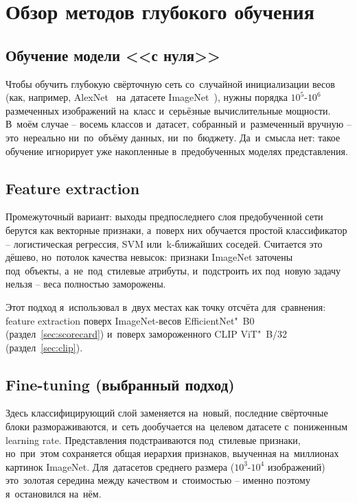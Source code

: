 \documentclass[a4paper,12pt]{diplom}
\begin{document}
\section{Обзор методов глубокого обучения}
\label{sec:methods}

\subsection{Обучение модели <<с нуля>>}

Чтобы обучить глубокую свёрточную сеть со~случайной инициализации весов (как, например, AlexNet~\cite{Krizhevsky:2012} на~датасете ImageNet~\cite{Deng:2009}), нужны порядка $10^5$-$10^6$ размеченных изображений на~класс и~серьёзные вычислительные мощности. В~моём случае -- восемь классов и~датасет, собранный и~размеченный вручную -- это~нереально ни~по~объёму данных, ни~по~бюджету. Да~и~смысла нет: такое обучение игнорирует уже накопленные в~предобученных моделях представления.

\subsection{Feature extraction}

Промежуточный вариант: выходы предпоследнего слоя предобученной сети берутся как векторные признаки, а~поверх них обучается простой классификатор -- логистическая регрессия, SVM или~k-ближайших соседей. Считается это дёшево, но~потолок качества невысок: признаки ImageNet заточены под~объекты, а~не~под~стилевые атрибуты, и~подстроить их под~новую задачу нельзя -- веса полностью заморожены.

Этот подход я~использовал в~двух местах как точку отсчёта для~сравнения: feature extraction поверх ImageNet-весов EfficientNet"~B0 (раздел~\ref{sec:scorecard}) и~поверх замороженного CLIP ViT"~B/32 (раздел~\ref{sec:clip}).

\subsection{Fine-tuning (выбранный подход)}

Здесь классифицирующий слой заменяется на~новый, последние свёрточные блоки размораживаются, и~сеть дообучается на~целевом датасете с~пониженным learning rate. Представления подстраиваются под~стилевые признаки, но~при~этом сохраняется общая иерархия признаков, выученная на~миллионах картинок ImageNet. Для~датасетов среднего размера ($10^3$-$10^4$ изображений) это~золотая середина между качеством и~стоимостью -- именно поэтому я~остановился на~нём.
\end{document}
